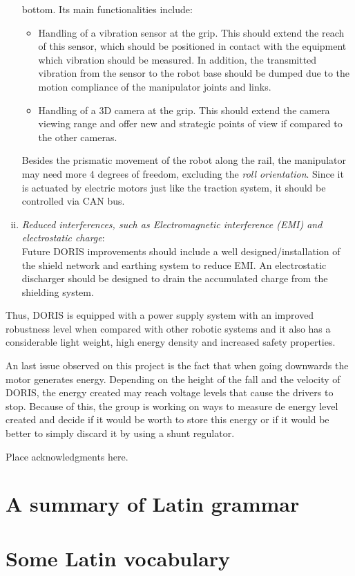 \documentclass{ifacconf}
\begin{document}
\begin{enumerate}[i)]
  bottom. Its main functionalities include:
  \begin{itemize}
    \item Handling of a vibration sensor at the grip. This should extend the
    reach of this sensor, which should be positioned in contact with the
    equipment which vibration should be measured. In addition, the transmitted
    vibration from the sensor to the robot base should be dumped due to the
    motion compliance of the manipulator joints and links.
    \item Handling of a 3D camera at the grip. This should extend the camera
    viewing range and offer new and strategic points of view if compared to the
    other cameras.
  \end{itemize}
  Besides the prismatic movement of the robot along the rail, the manipulator
  may need more 4 degrees of freedom, excluding the \emph{roll orientation}.
  Since it is actuated by electric motors just like the traction system, it
  should be controlled via CAN bus.\\
  \item \emph{Reduced interferences, such as Electromagnetic interference (EMI) and electrostatic charge}:\\
  \newline
  Future DORIS improvements should include a well designed/installation of the
  shield network and earthing system to reduce EMI. An electrostatic discharger
  should be designed to drain the accumulated charge from the shielding system.
\end{enumerate}

Thus, DORIS is equipped with a power supply system with an improved robustness
level when compared with other robotic systems and it also has a considerable
light weight, high energy density and increased safety properties.
 
An last issue observed on this project is the fact that when going downwards
the motor generates energy. Depending on the height of the fall and the
velocity of DORIS, the energy created may reach voltage levels that cause the
drivers to stop. Because of this, the group is working on ways to measure de
energy level created and decide if it would be worth to store this energy or if
it would be better to simply discard it by using a shunt regulator.
 

\begin{ack}
Place acknowledgments here.
\end{ack}

             

\appendix
\section{A summary of Latin grammar}    %
\section{Some Latin vocabulary}              %
\end{document}
